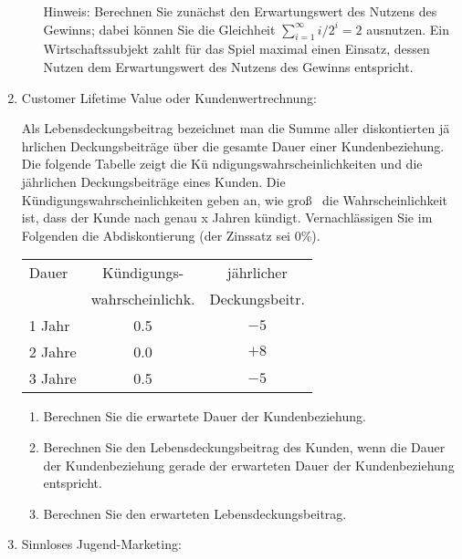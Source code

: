 \begin{enumerate}
\begin{enumerate}
Hinweis: Berechnen Sie zun\"{a}chst den Erwartungswert des Nutzens des
Gewinns; dabei k\"{o}nnen Sie die Gleichheit $\sum_{i=1}^{\infty }i/2^{i}=2$
ausnutzen. Ein Wirtschaftssubjekt zahlt f\"{u}r das Spiel maximal einen
Einsatz, dessen Nutzen dem Erwartungswert des Nutzens des Gewinns entspricht.
\end{enumerate}

\item Customer Lifetime Value oder Kundenwertrechnung:

Als Lebensdeckungsbeitrag bezeichnet man die Summe aller diskontierten j\"{a}%
hrlichen Deckungsbeitr\"{a}ge \"{u}ber die gesamte Dauer einer
Kundenbeziehung. Die folgende Tabelle zeigt die K\"{u}%
ndigungswahrscheinlichkeiten und die j\"{a}hrlichen Deckungsbeitr\"{a}ge
eines Kunden. Die K\"{u}ndigungswahrscheinlichkeiten geben an, wie gro\ss\ %
die Wahrscheinlichkeit ist, dass der Kunde nach genau x Jahren k\"{u}ndigt.
Vernachl\"{a}ssigen Sie im Folgenden die Abdiskontierung (der Zinssatz sei
0\%).
\begin{center}
\begin{tabular}{lcc}
\hline
Dauer & K\"{u}ndigungs- & j\"{a}hrlicher \\ 
& wahrscheinlichk. & Deckungsbeitr. \\ \hline
1 Jahr & 0.5 & $-5$ \\ 
2 Jahre & 0.0 & $+8$ \\ 
3 Jahre & 0.5 & $-5$ \\ \hline
\end{tabular}
\end{center}
\begin{enumerate}
\item Berechnen Sie die erwartete Dauer der Kundenbeziehung.
\item Berechnen Sie den Lebensdeckungsbeitrag des Kunden, wenn die Dauer der
Kundenbeziehung gerade der erwarteten Dauer der Kundenbeziehung entspricht.
\item Berechnen Sie den erwarteten Lebensdeckungsbeitrag.
\end{enumerate}

\item Sinnloses Jugend-Marketing:


\end{enumerate}
